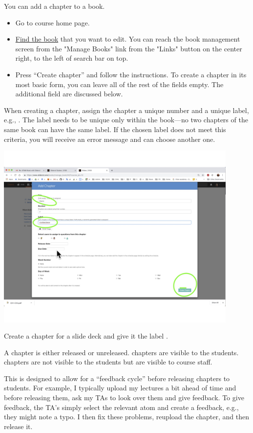 \begin{gram}
\label{guide:chapter::create}
You can add a chapter to a book.  
\begin{itemize}
\item Go to course home page.
\item \href{guide::author::go-book-management}{Find the book} that you
  want to edit.  You can reach the book management screen from the
  "Manage Books" link from the "Links" button on the center right, to
  the left of search bar on top.

\item  Press ``Create chapter'' and follow the instructions.  To create a chapter in its most basic form, you can leave all of the rest of the fields empty.  The additional field are discussed below.
\end{itemize}
%

When creating a chapter, assign the chapter a unique number and a unique label, e.g., .  
%
The label needs to be unique only within the book---no two chapters of
the same book can have the same label.
%
If the chosen label does not meet this criteria, you will receive an error message and can choose another one.

\includegraphics[width=0.9\textwidth]{staff/media/create-chapter.jpg}
\end{gram}

\begin{exercise}
Create a chapter for a slide deck and give it the label
.
\end{exercise}


\begin{gram}
A chapter is either released or unreleased. 
%
 chapters are visible to the students.
%
 chapters are not visible to the students but  are visible to course staff.  

This is designed to allow for a ``feedback cycle'' before releasing chapters to students.  
%
For example, I typically  upload my lectures a bit ahead of time and before releasing them, ask my TAs to look over them and give feedback.
%
To give feedback, the TA's simply select the relevant atom and create a feedback, e.g., they might note a typo.
%
I then fix these problems, reupload the chapter, and then release it.  
\end{gram}

